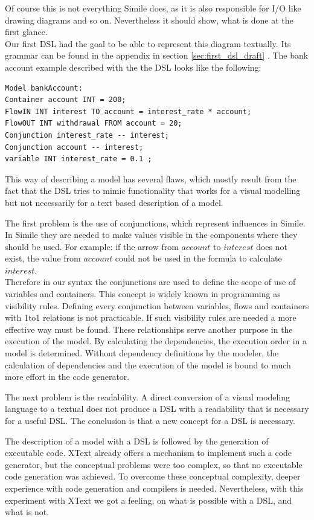\par
Of course this is not everything Simile does, as it is also responsible for I/O like drawing diagrams and so on. Nevertheless it should show, what is done at the first glance.\\
Our first DSL had the goal to be able to represent this diagram textually. Its grammar can be found in the appendix in section \ref{sec:first_dsl_draft} . The bank account example described with the the DSL looks like the following:
\begin{lstlisting}[language=firstDSL]
Model bankAccount:
Container account INT = 200;
FlowIN INT interest TO account = interest_rate * account;
FlowOUT INT withdrawal FROM account = 20;
Conjunction interest_rate -- interest;
Conjunction account -- interest;
variable INT interest_rate = 0.1 ;
\end{lstlisting}
\par
This way of describing a model has several flaws, which mostly result from the fact that the DSL tries to mimic functionality that works for a visual modelling but not necessarily for a text based description of a model.
\par
The first problem is the use of conjunctions, which represent influences in Simile. In Simile they are needed to make values visible in the components where they should be used. For example: if the arrow from $account$ to $interest$ does not exist, the value from $account$ could not be used in the formula to calculate $interest$.\\
Therefore in our syntax the conjunctions are used to define the scope of use of variables and containers. This concept is widely known in programming as visibility rules. Defining every conjunction between variables, flows and containers with 1to1 relations is not practicable. If such visibility rules are needed a more effective way must be found.
These relationships serve another purpose in the execution of the model. By calculating the dependencies, the execution order in a model is determined. Without dependency definitions by the modeler, the calculation of dependencies and the execution of the model is bound to much more effort in the code generator.
\par
The next problem is the readability. A direct conversion of a visual modeling language to a textual does not produce a DSL with a readability that is necessary for a useful DSL. The conclusion is that a new concept for a DSL is necessary.
\par
The description of a model with a DSL is followed by the generation of executable code. XText already offers a mechanism to implement such a code generator, but the conceptual problems were too complex, so that no executable code generation was achieved. To overcome these conceptual complexity, deeper experience with code generation and compilers is needed. Nevertheless, with this experiment with XText we got a feeling, on what is possible with a DSL, and what is not. 
